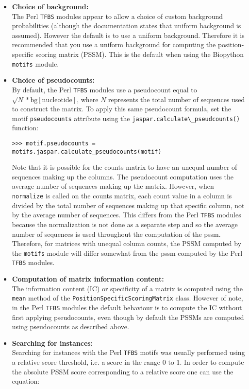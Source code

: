 \begin{itemize}
\item{\bf Choice of background:} \\
The Perl \verb+TFBS+ modules appear to allow a choice of custom background probabilities (although the documentation states that uniform background is assumed). However the default is to use a uniform background. Therefore it is recommended that you use a uniform background for computing the position-specific scoring matrix (PSSM). This is the default when using the Biopython \verb+motifs+ module.
\item{\bf Choice of pseudocounts:} \\
By default, the Perl \verb+TFBS+ modules use a pseudocount equal to $\sqrt{N} * \textrm{bg}[\textrm{nucleotide}]$, where $N$ represents the total number of sequences used to construct the matrix. To apply this same pseudocount formula, set the motif \verb+pseudocounts+ attribute using the \verb+jaspar.calculate\_pseudcounts()+ function:
\begin{verbatim}
>>> motif.pseudocounts = motifs.jaspar.calculate_pseudocounts(motif)
\end{verbatim}
Note that it is possible for the counts matrix to have an unequal number of sequences making up the columns. The pseudocount computation uses the average number of sequences making up the matrix. However, when \verb+normalize+ is called on the counts matrix, each count value in a column is divided by the total number of sequences making up that specific column, not by the average number of sequences. This differs from the Perl \verb+TFBS+ modules because the normalization is not done as a separate step and so the average number of sequences is used throughout the computation of the pssm. Therefore, for matrices with unequal column counts, the PSSM computed by the \verb+motifs+ module will differ somewhat from the pssm computed by the Perl \verb+TFBS+ modules.
\item{\bf Computation of matrix information content:} \\
The information content (IC) or specificity of a matrix is computed using the \verb+mean+ method of the \verb+PositionSpecificScoringMatrix+ class. However of note, in the Perl \verb+TFBS+ modules the default behaviour is to compute the IC without first applying pseudocounts, even though by default the PSSMs are computed using pseudocounts as described above.
\item{\bf Searching for instances:} \\
Searching for instances with the Perl \verb+TFBS+ motifs was usually performed using a relative score threshold, i.e. a score in the range 0 to 1. In order to compute the absolute PSSM score corresponding to a relative score one can use the equation:

\end{itemize}
